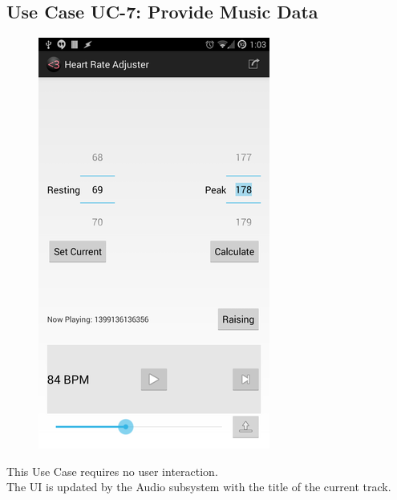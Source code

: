 \documentclass[letterpaper,english, 12pt]{scrreprt}
\begin{document}
\subsection{Use Case UC-7: Provide Music Data}
\begin{figure}[H]
	\centering
	\includegraphics{img/Prelim_Design/1.png}\\
\end{figure}

This Use Case requires no user interaction.\\
The UI is updated by the Audio subsystem with the title of the current track.
\end{document}
